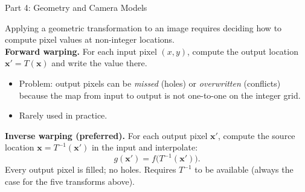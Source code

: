 \documentclass[letterpaper]{article}
\begin{document}
\begin{notes}{Part 4: Geometry and Camera Models}



Applying a geometric transformation to an image requires deciding how to compute pixel values at non-integer locations.\\

\textbf{Forward warping.} For each input pixel $(x,y)$, compute the output location $\mathbf{x}' = T(\mathbf{x})$ and write the value there.
\begin{itemize}
    \item Problem: output pixels can be \emph{missed} (holes) or \emph{overwritten} (conflicts) because the map from input to output is not one-to-one on the integer grid.
    \item Rarely used in practice.
\end{itemize}

\textbf{Inverse warping (preferred).} For each output pixel $\mathbf{x}'$, compute the source location $\mathbf{x} = T^{-1}(\mathbf{x}')$ in the input and interpolate:
$$g(\mathbf{x}') = f\bigl(T^{-1}(\mathbf{x}')\bigr).$$
Every output pixel is filled; no holes. Requires $T^{-1}$ to be available (always the case for the five transforms above).\\





\end{notes}
\end{document}
